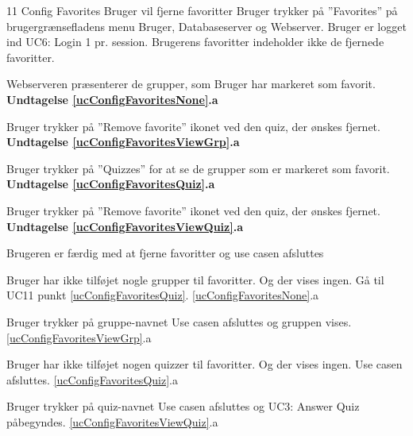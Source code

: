 
\uchead
	{11}
	{Config Favorites}
	{Bruger vil fjerne favoritter}
	{Bruger trykker på ''Favorites'' på brugergrænsefladens menu}
	{Bruger, Databaseserver og Webserver.}
	{Bruger er logget ind} %
	{UC6: Login}
	{1 pr. session.}
	{Brugerens favoritter indeholder ikke de fjernede favoritter.}

\item \label{ucConfigFavoritesNone} Webserveren præsenterer de  grupper, som Bruger har markeret som favorit.
\textbf{Undtagelse \ref{ucConfigFavoritesNone}.a}

\item \label{ucConfigFavoritesViewGrp}Bruger trykker på ''Remove favorite'' ikonet ved den quiz, der ønskes fjernet.
\textbf{Undtagelse \ref{ucConfigFavoritesViewGrp}.a}

\item \label{ucConfigFavoritesQuiz}Bruger trykker på ''Quizzes'' for at se de grupper som er markeret som favorit.
\textbf{Undtagelse \ref{ucConfigFavoritesQuiz}.a}

\item \label{ucConfigFavoritesViewQuiz}Bruger trykker på ''Remove favorite'' ikonet ved den quiz, der ønskes fjernet.
\textbf{Undtagelse \ref{ucConfigFavoritesViewQuiz}.a}

\item Brugeren er færdig med at fjerne favoritter og use casen afsluttes

\ucdescriptionend

\ucextension
	{Bruger har ikke tilføjet nogle grupper til favoritter. Og der vises ingen.}
	{Gå til UC11 punkt \ref{ucConfigFavoritesQuiz}.}
	{\ref{ucConfigFavoritesNone}.a}
		
\ucextension
	{Bruger trykker på gruppe-navnet}
	{Use casen afsluttes og gruppen vises.}
	{\ref{ucConfigFavoritesViewGrp}.a}		
		
\ucextension
			{Bruger har ikke tilføjet nogen quizzer til favoritter. Og der vises ingen.}
	{Use casen afsluttes.}
	{\ref{ucConfigFavoritesQuiz}.a}
	
\ucextension
	{Bruger trykker på quiz-navnet}
	{Use casen afsluttes og UC3: Answer Quiz påbegyndes.}
	{\ref{ucConfigFavoritesViewQuiz}.a}
		
